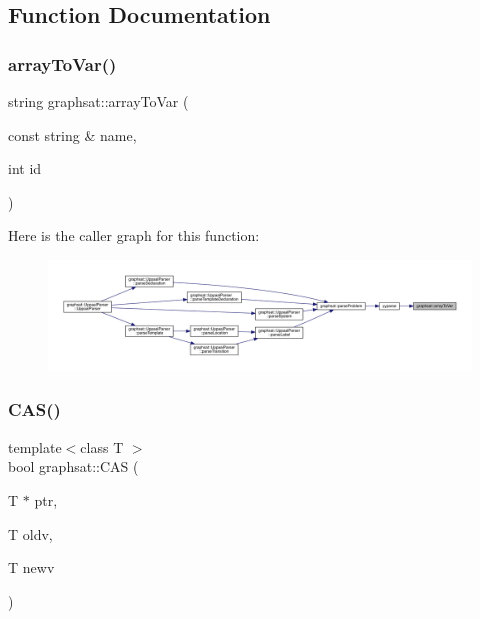 \subsection{Function Documentation}
\mbox{\label{namespacegraphsat_a39f9605ea5701e91ea4d24f9b1e492ab}} 
\subsubsection{\texorpdfstring{arrayToVar()}{arrayToVar()}}
{\footnotesize\ttfamily string graphsat\+::array\+To\+Var (\begin{DoxyParamCaption}\item[{const string \&}]{name,  }\item[{int}]{id }\end{DoxyParamCaption})\hspace{0.3cm}{\ttfamily [inline]}}

Here is the caller graph for this function\+:
\nopagebreak
\begin{figure}[H]
\begin{center}
\leavevmode
\includegraphics[width=350pt]{namespacegraphsat_a39f9605ea5701e91ea4d24f9b1e492ab_icgraph}
\end{center}
\end{figure}
\mbox{\label{namespacegraphsat_a6ba86c7b7b22c55dc8f404d1928ab71e}} 
\subsubsection{\texorpdfstring{CAS()}{CAS()}}
{\footnotesize\ttfamily template$<$class T $>$ \\
bool graphsat\+::\+C\+AS (\begin{DoxyParamCaption}\item[{T $\ast$}]{ptr,  }\item[{T}]{oldv,  }\item[{T}]{newv }\end{DoxyParamCaption})\hspace{0.3cm}{\ttfamily [inline]}}

